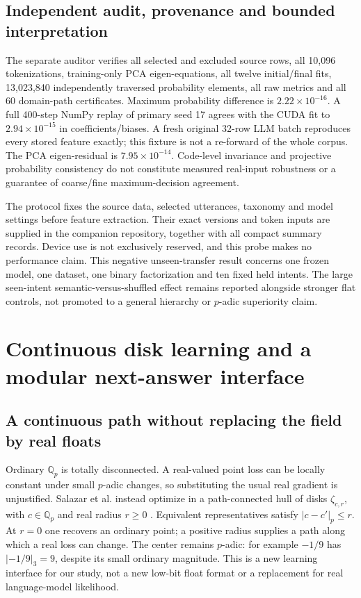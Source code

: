 \documentclass[11pt]{article}
\newcommand{\Qp}{\mathbb{Q}_p}
\begin{document}
\subsection{Independent audit, provenance and bounded interpretation}

The separate auditor verifies all selected and excluded source rows,
all 10,096 tokenizations, training-only PCA eigen-equations, all twelve
initial/final fits, 13,023,840 independently traversed probability elements,
all raw metrics and all 60 domain-path certificates. Maximum probability
difference is \(2.22\times10^{-16}\). A full 400-step NumPy replay of
primary seed 17 agrees with the CUDA fit to \(2.94\times10^{-15}\) in
coefficients/biases. A fresh original 32-row LLM batch reproduces every
stored feature exactly; this fixture is not a re-forward of the whole corpus.
The PCA eigen-residual is \(7.95\times10^{-14}\). Code-level invariance and
projective probability consistency do not constitute measured real-input
robustness or a guarantee of coarse/fine maximum-decision agreement.

The protocol fixes the source data, selected utterances, taxonomy and
model settings before feature extraction. Their exact versions and token
inputs are supplied in the companion repository, together with all compact
summary records. Device use is not exclusively reserved, and this probe
makes no performance claim.
This negative unseen-transfer result concerns one frozen model, one dataset,
one binary factorization and ten fixed held intents. The large seen-intent
semantic-versus-shuffled effect remains reported alongside stronger flat
controls, not promoted to a general hierarchy or \(p\)-adic superiority claim.


\section{Continuous disk learning and a modular next-answer interface}
\label{si:continuous-learning}

\subsection{A continuous path without replacing the field by real floats}

Ordinary \(\Qp\) is totally disconnected. A real-valued point loss can be
locally constant under small \(p\)-adic changes, so substituting the usual
real gradient is unjustified. Salazar et al. instead optimize in a
path-connected hull of disks \(\zeta_{c,r}\), with \(c\in\Qp\) and real
radius \(r\geq0\) \citep{salazar2026continuous}. Equivalent representatives
satisfy \(|c-c'|_p\leq r\). At \(r=0\) one recovers an ordinary point;
a positive radius supplies a path along which a real loss can change.
The center remains \(p\)-adic: for example \(-1/9\) has
\(|-1/9|_3=9\), despite its small ordinary magnitude. This is a new learning
interface for our study, not a new low-bit float format or a replacement
for real language-model likelihood.
\end{document}

